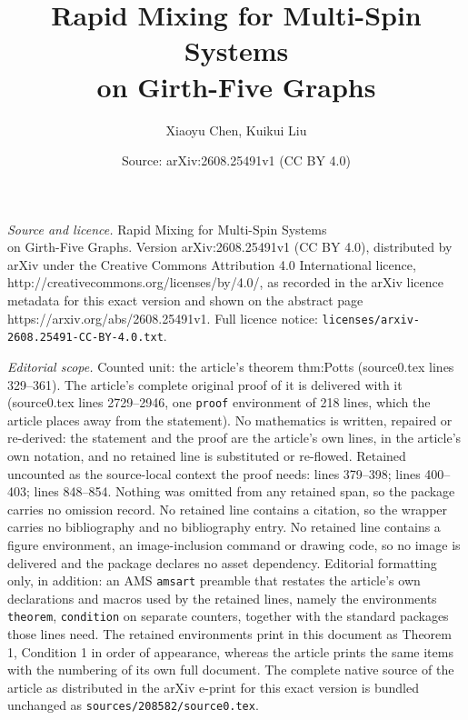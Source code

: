 \documentclass[10pt,a4paper]{amsart}
\title{Rapid Mixing for Multi-Spin Systems \\ on Girth-Five Graphs}
\author{Xiaoyu Chen, Kuikui Liu}
\date{Source: arXiv:2608.25491v1 (CC BY 4.0)}
\begin{document}
\maketitle

\noindent\emph{Source and licence.} Rapid Mixing for Multi-Spin Systems \\ on Girth-Five Graphs. Version arXiv:2608.25491v1 (CC BY 4.0), distributed by arXiv under the Creative Commons Attribution 4.0 International licence, http://creativecommons.org/licenses/by/4.0/, as recorded in the arXiv licence metadata for this exact version and shown on the abstract page https://arxiv.org/abs/2608.25491v1. Full licence notice: \texttt{licenses/arxiv-2608.25491-CC-BY-4.0.txt}.\par\smallskip

\noindent\textit{Editorial scope.} Counted unit: the article's theorem thm:Potts (source0.tex lines 329--361). The article's complete original proof of it is delivered with it (source0.tex lines 2729--2946, one \texttt{proof} environment of 218 lines, which the article places away from the statement). No mathematics is written, repaired or re-derived: the statement and the proof are the article's own lines, in the article's own notation, and no retained line is substituted or re-flowed.  Retained uncounted as the source-local context the proof needs: lines 379--398; lines 400--403; lines 848--854.  Nothing was omitted from any retained span, so the package carries no omission record.  No retained line contains a citation, so the wrapper carries no bibliography and no bibliography entry.  No retained line contains a figure environment, an image-inclusion command or drawing code, so no image is delivered and the package declares no asset dependency.  Editorial formatting only, in addition: an AMS \texttt{amsart} preamble that restates the article's own declarations and macros used by the retained lines, namely the environments \texttt{theorem}, \texttt{condition} on separate counters, together with the standard packages those lines need.  The retained environments print in this document as Theorem 1, Condition 1 in order of appearance, whereas the article prints the same items with the numbering of its own full document.  The complete native source of the article as distributed in the arXiv e-print for this exact version is bundled unchanged as \texttt{sources/208582/source0.tex}.
\end{document}
